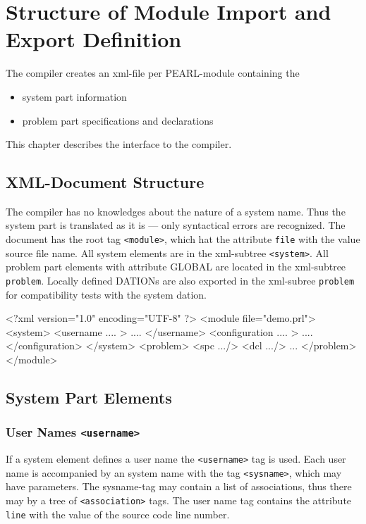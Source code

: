 \chapter{Structure of Module Import and Export Definition}

The compiler creates an xml-file per PEARL-module containing the
\begin{itemize}
\item system part information
\item problem part specifications and declarations
\end{itemize}

This chapter describes the interface to the compiler.

\section{XML-Document Structure}
The compiler has no knowledges about the nature of a system name.
Thus the system part is translated as it is --- only syntactical errors
are recognized. 
The document has the root tag \verb|<module>|, which hat the attribute
\verb|file| with the value source file name.  
All system elements are in the xml-subtree \verb|<system>|.
All problem part elements with attribute GLOBAL are located
in the xml-subtree \verb|problem|.
Locally defined  DATIONs are also exported in the xml-subree \verb|problem| 
for compatibility tests with the system dation.

\begin{XMLCode}
<?xml version="1.0" encoding="UTF-8" ?>
<module file="demo.prl">
<system>
   <username .... >
   ....
   </username>
   <configuration .... >
   ....
   </configuration>
</system>
<problem>
  <spc .../>
  <dcl .../>
  ...
</problem>
</module>
\end{XMLCode}

\section{System Part Elements}
\subsection{User Names \texttt{<username>}}
If a system element defines a user name the \verb|<username>| tag is 
used. Each user name is accompanied by an system name with the tag 
\verb|<sysname>|, which may have parameters.
The sysname-tag may contain a list of associations, thus there may by a tree
of \verb|<association>| tags.
The user name tag contains the attribute \verb|line| with the value of the 
source code line number.

